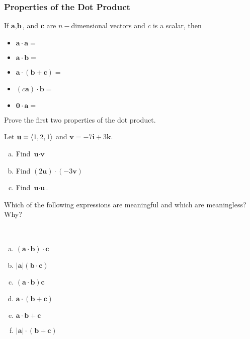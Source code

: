 \documentclass[notes]{subfiles}
\begin{document}
	\subsubsection*{Properties of the Dot Product}
		\begin{rmk}
			If $\textbf{a}, \textbf{b}$, and $\textbf{c}$ are $n-$dimensional vectors and $c$ is a scalar, then \\[15pt]
			\begin{itemize}
			\setlength\itemsep{15pt}
			
			\item $\textbf{a}\cdot\textbf{a} =$
			\item $\textbf{a}\cdot \textbf{b} = $
			\item $\textbf{a}\cdot (\textbf{b} + \textbf{c}) = $
			\item $(c\textbf{a})\cdot \textbf{b} = $
			\item $\textbf{0}\cdot \textbf{a} = $
			\end{itemize}
		\end{rmk}
		
		\begin{ex}
			Prove the first two properties of the dot product.
		\end{ex}
			\newpage
			
		\begin{ex}
			Let $\textbf{u} = \left\langle 1,2,1\right\rangle$ and $\textbf{v} = -7\textbf{i} + 3\textbf{k}$.
			\begin{enumerate}[(a)]
				\item Find $\textbf{u}\cdot\textbf{v}$
				\item Find $(2\textbf{u})\cdot (-3\textbf{v})$
				\item Find $\textbf{u}\cdot\textbf{u}$.  
			\end{enumerate}
		\end{ex}
		
		\begin{ex}
			Which of the following expressions are meaningful and which are meaningless?  Why?
		\end{ex}\\
		\begin{minipage}{7in}
			\begin{multicols*}{2}
				\begin{enumerate}[(a)]
					\setlength\itemsep{50pt}
					\item $(\textbf{a}\cdot\textbf{b})\cdot\textbf{c}$
					\item $|\textbf{a}|(\textbf{b}\cdot \textbf{c})$
					\item $(\textbf{a}\cdot\textbf{b})\textbf{c}$
						\columnbreak
					\item $\textbf{a}\cdot (\textbf{b}+\textbf{c})$
					\item $\textbf{a}\cdot \textbf{b}+\textbf{c}$
					\item $|\textbf{a}|\cdot (\textbf{b}+\textbf{c})$
				\end{enumerate}
					\raggedcolumns
			\end{multicols*}
		\end{minipage}
			\newpage
		
\end{document}
